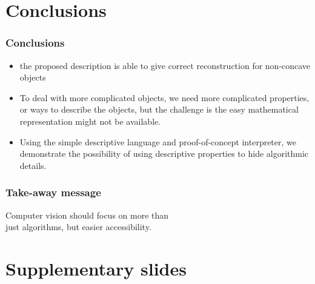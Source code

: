 \documentclass{beamer}
\begin{document}
\section{Conclusions}
\begin{frame}
\tableofcontents[currentsection,currentsubsection, 
    hideothersubsections, 
    sectionstyle=show/shaded,]
\end{frame}

\begin{frame}
\frametitle{Conclusions}

\begin{itemize}
\item the proposed description is able to give correct reconstruction for non-concave objects
\item To deal with more complicated objects, we need more complicated properties, or ways to describe the objects, but the challenge is the easy mathematical representation might not be available.
\item Using the simple descriptive language and proof-of-concept interpreter, we demonstrate the possibility of using descriptive properties to hide algorithmic details.
\end{itemize}
\end{frame}

\begin{frame}
\frametitle{Take-away message}
\centering
Computer vision should focus on more than \\just algorithms, but easier accessibility.
\end{frame}

\section{Supplementary slides}
\begin{frame}
\tableofcontents[currentsection,currentsubsection, 
    hideothersubsections, 
    sectionstyle=show/shaded,]
\end{frame}
\end{document}
